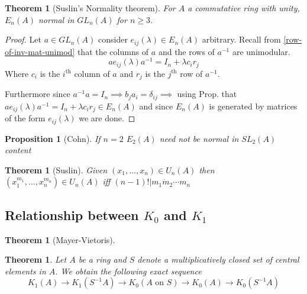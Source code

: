 \documentclass[12pt]{article}
\numberwithin{equation}{section}
\newcounter{dummy} \numberwithin{dummy}{section}
\newtheorem{theorem}[dummy]{Theorem}
\newtheorem{proposition}[dummy]{Proposition}
\begin{document}
	\begin{theorem}[Suslin's Normality theorem]
		For $A$ a commutative ring with unity, $E_n(A)$ normal in $GL_n(A)$ for $n \geq 3$. 
	\end{theorem}
	\begin{proof}
		Let $a \in GL_n(A)$ consider $e_{ij}(\lambda) \in E_n(A)$ arbitrary. Recall from \ref{row-of-inv-mat-unimod} that the columns of $a$ and the rows of $a^{-1}$ are unimodular.
		\[ ae_{ij} (\lambda ) a^{-1}= I_n +\lambda c_i r_j\]
		Where $c_i$ is the $i^\mathrm{th}$ column of $a$ and $r_j$ is the $j^{\mathrm{th}}$ row of $a^{-1}$.
		
		Furthermore since $a^{-1}a=I_n \implies b_ja_i=\delta_{ij} \implies $ using Prop. that $ae_{ij}(\lambda) a^{-1} = I_n + \lambda c_i r_j \in E_n(A)$ and since $E_n(A)$ is generated by matrices of the form $e_{ij}(\lambda )$ we are done.
	\end{proof}
	
	\begin{proposition}[Cohn] If $n=2$ $E_2(A)$ need not be normal in $SL_2(A)$
		content
	\end{proposition}
	
	\begin{theorem}[Suslin]
		Given $(x_1,\dots,x_n) \in U_n(A)$ then $(x_1^{m_1}, \dots, x_n^{m_n}) \in U_n(A)$ iff $(n-1)! | m_1\dot m_2 \cdots m_n$
	\end{theorem}
	
	\subsection{Relationship between $K_0$ and $K_1$}
	\begin{theorem}[Mayer-Vietoris]
	\end{theorem}
	\begin{theorem}
		Let $A$ be a ring and $S$ denote a multiplicatively closed set of central elements in $A$. We obtain the following exact sequence
		\[ K_1(A)  \to K_1(S^{-1}A ) \to K_0(A \text{ on } S) \to K_0(A) \to K_0(S^{-1} A)\]
	\end{theorem}
	
%	
	
\end{document}
